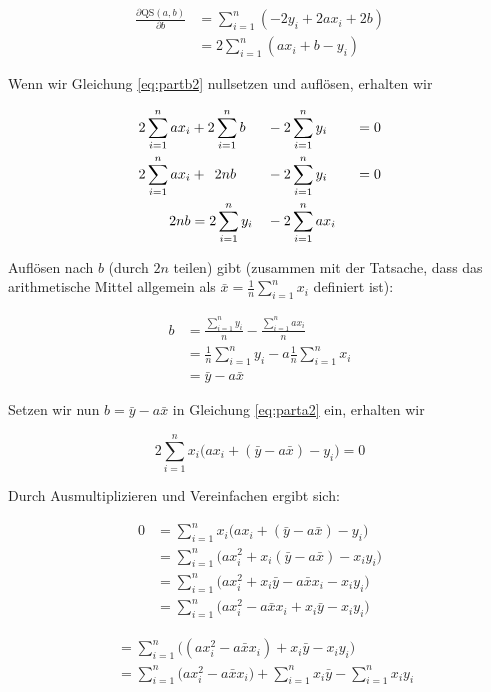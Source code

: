\documentclass[ngerman, 12pt]{scrartcl}
\def\qs{\text{QS}(a,b)}
\def\sm{\sum\limits_{i=1}^{n}}
\begin{document}
\begin{align}
\frac{\partial \qs}{\partial b}	&= \sm (-2y_i+2ax_i +2b) \label{eq:partb1}\\
								&= 2 \sm (ax_i + b -y_i) \label{eq:partb2}
\end{align}

Wenn wir Gleichung \ref{eq:partb2} nullsetzen und auflösen, erhalten wir 

\begin{alignat}{3}
2\sm ax_i &+ 2\sm b &&- 2 \sm y_i \quad &&= 0 \\
2\sm ax_i &+ \enskip 2nb &&- 2 \sm y_i \quad &&= 0 \\ 
2nb &= 2 \sm y_i &&- 2\sm ax_i && 
\end{alignat}

Auflösen nach \(b\) (durch \(2n\) teilen) gibt (zusammen mit der Tatsache, dass das arithmetische Mittel allgemein als \(\bar{x}= \frac{1}{n} \sm x_i \) definiert ist):

\begin{align}
b &= \frac{\sm y_i}{n} - \frac{\sm ax_i}{n} \\
	&= \frac{1}{n} \sm y_i - a \frac{1}{n} \sm x_i \\
	&= \bar{y} - a \bar{x}
\end{align}

Setzen wir nun \(b=\bar{y} - a \bar{x}\) in Gleichung \ref{eq:parta2} ein, erhalten wir

\begin{equation}
	2\sm x_i \big(ax_i + (\bar{y} - a \bar{x}) - y_i\big)=0
	\label{eq:einsetz}
\end{equation}

Durch Ausmultiplizieren und Vereinfachen ergibt sich:

\begin{align}
  0 &= \sm x_i \big(ax_i + (\bar{y} - a \bar{x}) - y_i\big) \\
	&= \sm \big(ax_i^2+x_i(\bar{y}-a\bar{x})-x_iy_i \big) \\
     &= \sm \big(ax_i^2 + x_i\bar{y} - a\bar{x}x_i- x_iy_i \big) \\
     &= \sm \big(ax_i^2 - a\bar{x}x_i + x_i\bar{y} - x_iy_i \big) 
\end{align}

\begin{align}
     &= \sm \big( (ax_i^2 - a\bar{x}x_i) + x_i\bar{y} - x_iy_i \big) \\
     &= \sm \big( ax_i^2 - a\bar{x}x_i \big) + \sm x_i\bar{y} - \sm x_iy_i 
\end{align}
\end{document}

